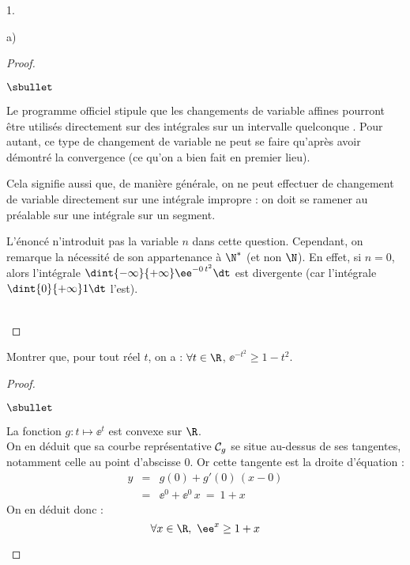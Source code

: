 \documentclass[11pt]{article}%
\begin{document}
\begin{noliste}{1.}
\begin{noliste}{a)}
\begin{proof}
      \newpage

      
      \begin{remark}
        \begin{noliste}{$\sbullet$}
        \item Le programme officiel stipule que \og les changements de
          variable affines pourront être utilisés directement sur des
          intégrales sur un intervalle quelconque \fg{}. Pour autant,
          ce type de changement de variable ne peut se faire qu'après
          avoir démontré la convergence (ce qu'on a bien fait en
          premier lieu).
          
        \item Cela signifie aussi que, de manière générale, on ne peut
          effectuer de changement de variable directement sur une
          intégrale impropre : on doit se ramener au préalable sur une
          intégrale sur un segment.
          
        \item L'énoncé n'introduit pas la variable $n$ dans cette
          question. Cependant, on remarque la nécessité de son
          appartenance à $\N^*$ (et non $\N$). En effet, si $n=0$,
          alors l'intégrale $\dint{-\infty}{+\infty} \ee^{-0 \, t^2}
          \dt$ est divergente (car l'intégrale $\dint{0}{+\infty} 1
          \dt$ l'est).
        \end{noliste}
      \end{remark}~\\[-1.4cm]
    \end{proof}
    
  \item Montrer que, pour tout réel $t$, on a : $\forall t \in \R$,
    $\ee^{-t^2} \geq 1-t^2$.
    \begin{proof}~
      \begin{noliste}{$\sbullet$}
      \item La fonction $g : t \mapsto \ee^t$ est convexe sur $\R$.\\
        On en déduit que sa courbe représentative ${\cal C}_g$ se
        situe au-dessus de ses tangentes, notamment celle au point
        d'abscisse $0$. Or cette tangente est la droite d'équation :
        \[
          \begin{array}{rcl}
            y & = & g(0) + g'(0) \, (x-0)
            \\[.2cm]
            & = & \ee^0 + \ee^0 \, x \ = \ 1+x
          \end{array}
        \]
        On en déduit donc :
        \[
          \forall x \in \R, \ \ee^x \geq 1+x
        \]
        

\end{noliste}
\end{proof}
\end{noliste}
\end{noliste}
\end{document}
